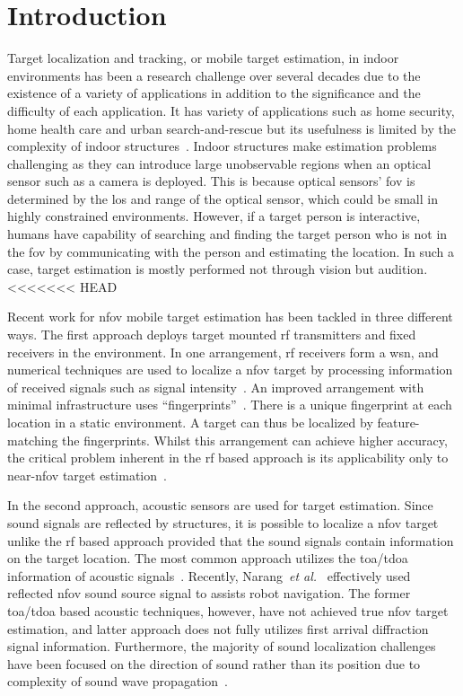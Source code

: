 \documentclass[letterpaper, 10 pt, conference]{ieeeconf}  %
\begin{document}
\section{Introduction}
Target localization and tracking, or mobile target estimation, in indoor environments has been a research challenge over several decades due to the existence of a variety of applications in addition to the significance and the difficulty of each application. It has variety of applications such as home security, home health care and urban search-and-rescue but its usefulness is limited by the complexity of indoor structures~\cite{priyantha2005mobile,Khoury2009,argentieri2014survey}. Indoor structures make estimation problems challenging as they can introduce large unobservable regions when an optical sensor such as a camera is deployed.  This is because optical sensors' \acrfull{fov} is determined by the \gls{los} and range of the optical sensor, which could be small in highly constrained environments. However, if a target person is interactive, humans have capability of searching and finding the target person who is not in the \gls{fov} by communicating with the person and estimating the location. In such a case, target estimation is mostly performed not through vision but audition. 
<<<<<<< HEAD

Recent work for \acrfull{nfov} mobile target estimation has been tackled in three different ways. The first approach deploys target mounted \gls{rf} transmitters and fixed receivers in the environment.  In one arrangement, \gls{rf} receivers form a \gls{wsn}, and numerical techniques are used to localize a \gls{nfov} target by processing information of received signals such as signal intensity~\cite{Dai2012,Guvenc2009}. An improved arrangement with minimal infrastructure uses ``fingerprints''~\cite{Bahl2000,lad04}. There is a unique fingerprint at each location in a static environment.  A target can thus be localized by feature-matching the fingerprints.  Whilst this arrangement can achieve higher accuracy, the critical problem inherent in the \gls{rf} based approach is its applicability only to near-\gls{nfov} target estimation~\cite{priyantha2005mobile,Seow2008}. 

In the second approach, acoustic sensors are used for target estimation.  Since sound signals are reflected by structures, it is possible to localize a \gls{nfov} target unlike the \gls{rf} based approach provided that the sound signals contain information on the target location. The most common approach utilizes the \acrfull{toa}/\gls{tdoa} information of acoustic signals~\cite{hu2011simultaneous,ward2003particle,Mak2009}. Recently, Narang~{\it et al.}~\cite{narang2014auditory} effectively used reflected \gls{nfov} sound source signal to assists robot navigation.  The former \gls{toa}/\gls{tdoa} based acoustic techniques, however, have not achieved true \gls{nfov} target estimation, and latter approach does not fully utilizes first arrival diffraction signal information. Furthermore, the majority of sound localization challenges have been focused on the direction of sound rather than its position due to complexity of sound wave propagation~\cite{tamai2005three,sva12}.  
\end{document}
